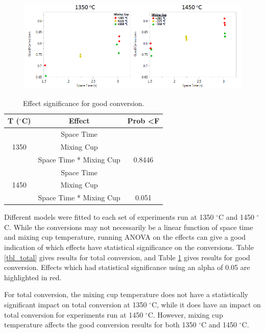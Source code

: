 \documentclass[11pt,twocolumn]{article}
\begin{document}
\begin{figure}
	\centering
	\includegraphics[width = \textwidth]{x_good.png}
	\caption{}
	\label{plot_good}
\end{figure}

\begin{table}
	\centering
	\caption{Effect significance for good conversion.}
	\label{tbl_good}
	\begin{tabular}{|c|c|c|}
	\hline
	T ($^\circ$C)			&	Effect				&	Prob \textless F	\\
	\hline
	\multirow{3}{*}{1350}	&	Space Time			&	\color{red}{0.0015} \\
	{}					&	Mixing Cup			&	\color{red}{0.0391} \\
	{}					&	Space Time * Mixing Cup	&	0.8446 \\
	\hline
	\multirow{3}{*}{1450}	&	Space Time			&	\color{red}{\textless 0.0001} \\
	{}					&	Mixing Cup			&	\color{red}{0.0001} \\
	{}					&	Space Time * Mixing Cup	&	0.051 \\	
	\hline
	\end{tabular}
\end{table}

Different models were fitted to each set of experiments run at 1350 $^\circ$C and 1450 $^\circ$C. While the
conversions may not necessarily be a linear function of space time and mixing cup temperature,
running ANOVA on the effects can give a good
indication of which effects have statistical significance on the conversions. Table \ref{tbl_total} gives results
for total conversion, and Table \ref{tbl_good} gives results for
good conversion. Effects which had statistical significance using an alpha of 0.05 are highlighted in
red.

For total conversion, the mixing cup temperature does not have a statistically significant impact on total conversion at 1350 $^\circ$C, while it does
have an impact on total conversion for experiments run at 1450 $^\circ$C. However, mixing cup temperature affects the good conversion results for
both 1350 $^\circ$C and 1450 $^\circ$C.
\end{document}
